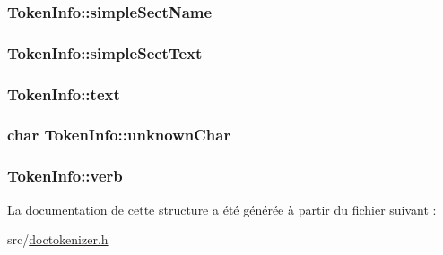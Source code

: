 \subsubsection[{simple\+Sect\+Name}]{ Token\+Info\+::simple\+Sect\+Name}\label{struct_token_info_af3c275c68061c64ea6b5fb513a6d118b}
\hypertarget{struct_token_info_ab1f904a5dcf5fd5ac09be589a7ad734e}{}
\subsubsection[{simple\+Sect\+Text}]{ Token\+Info\+::simple\+Sect\+Text}\label{struct_token_info_ab1f904a5dcf5fd5ac09be589a7ad734e}
\hypertarget{struct_token_info_a55ddc22fdcbb1121681b831154389e07}{}
\subsubsection[{text}]{ Token\+Info\+::text}\label{struct_token_info_a55ddc22fdcbb1121681b831154389e07}
\hypertarget{struct_token_info_a6c01376dcc8a973fa6cfbdb54a71a7cf}{}
\subsubsection[{unknown\+Char}]{\setlength{\rightskip}{0pt plus 5cm}char Token\+Info\+::unknown\+Char}\label{struct_token_info_a6c01376dcc8a973fa6cfbdb54a71a7cf}
\hypertarget{struct_token_info_a3fec10a272a450f7dd40948b5d6e33b4}{}
\subsubsection[{verb}]{ Token\+Info\+::verb}\label{struct_token_info_a3fec10a272a450f7dd40948b5d6e33b4}


La documentation de cette structure a été générée à partir du fichier suivant \+:\begin{DoxyCompactItemize}
\item 
src/\hyperlink{doctokenizer_8h}{doctokenizer.\+h}\end{DoxyCompactItemize}
